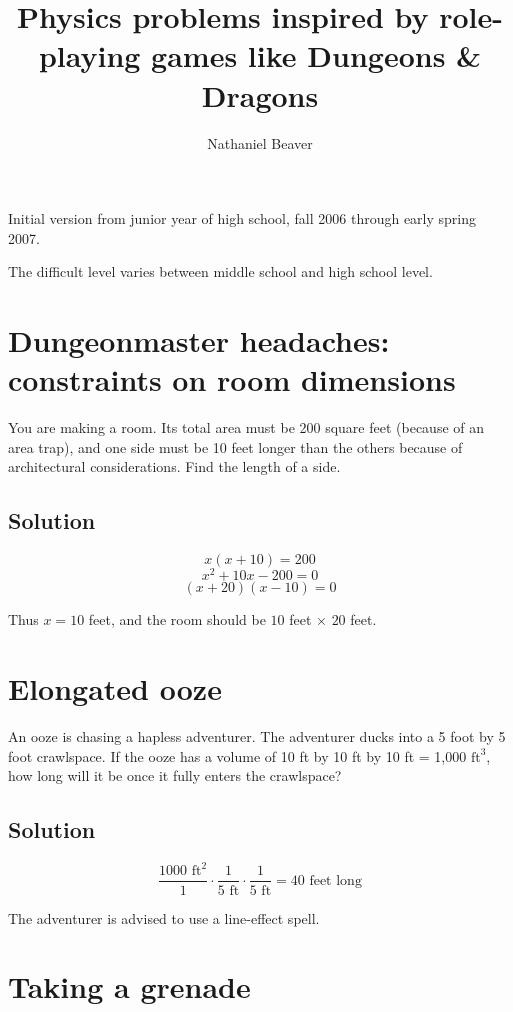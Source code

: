 \documentclass[12pt,letterpaper]{article}
\author{Nathaniel Beaver}
\title{Physics problems inspired by role-playing games like Dungeons \& Dragons}
\begin{document}
\maketitle

Initial version from junior year of high school, fall 2006 through early spring 2007.

The difficult level varies between middle school and high school level.

\section{Dungeonmaster headaches: constraints on room dimensions}

You are making a room. Its total area must be 200 square feet (because of an area trap), and one side must be 10 feet longer than the others because of architectural considerations. Find the length of a side.

\subsection{Solution}

\[x(x+10) = 200\]
\[x^2 + 10x - 200 = 0\]
\[(x+20)(x-10) = 0\]

Thus $x = 10$ feet, and the room should be $10$ feet $\times$ $20$ feet.

\section{Elongated ooze}

An ooze is chasing a hapless adventurer. The adventurer ducks into a 5 foot by 5 foot crawlspace. If the ooze has a volume of 10 ft by 10 ft by 10 ft = 1,000 $\textrm{ft}^3$, how long will it be once it fully enters the crawlspace?

\subsection{Solution}

\[
\frac{1000 \textrm{ ft}^2}{1}
\cdot
\frac{1}{5 \textrm{ ft}}
\cdot
\frac{1}{5 \textrm{ ft}}
=
40 \textrm{ feet long}
\]

The adventurer is advised to use a line-effect spell.

\section{Taking a grenade}
\end{document}
